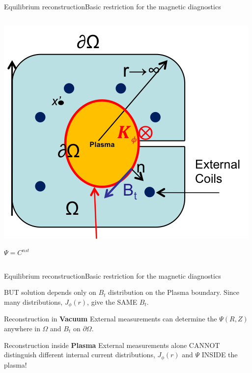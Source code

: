 \documentclass{beamer}
\begin{document}
\begin{frame}{Equilibrium reconstruction}{Basic restriction for  the magnetic diagnostics }
\begin{columns}
   \begin{center}
 	\includegraphics[trim = 1mm 1mm 8mm 1mm, clip, width=.7\columnwidth]{xsection2.png}

	{ \color{red}   $ \Psi = C^{nst}$  }
   \end{center}
 \end{columns}
 
 \visible<3->{ \begin{block}{}%
Term 3 in the only one that depends  on internal current distribution, $J_\phi(r)$.
\end{block} 
}
 \end{frame}
 
 \begin{frame}{Equilibrium reconstruction}{Basic restriction for  the magnetic diagnostics }
 \begin{block}{} 
BUT solution depends only on $B_t$ distribution on the Plasma boundary.
Since many distributions, $J_\phi(r)$, give the SAME  $B_t$.
\end{block} 

 \begin{block}{Reconstruction in \textbf{Vacuum}  \smiley } 
 {
		External  measurements can determine the $\Psi(R,Z)$ anywhere in $\Omega$  and  $B_t$  on 
	$\partial  \Omega$. ~~~  \smiley
}
\end{block} 

 \begin{block}{Reconstruction inside  \textbf{Plasma} \frownie  } 
 {\color<2->{red}
	External  measurements alone  CANNOT distinguish  different internal current distributions, 
	$J_\phi(r)$ and $\Psi$ INSIDE the plasma! \frownie 
}
\end{block} 
\end{frame}
\end{document}
